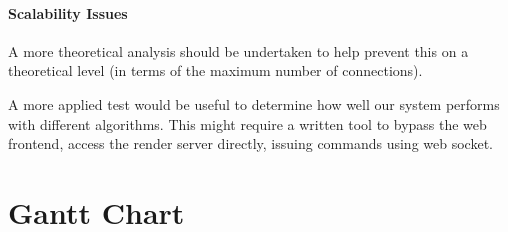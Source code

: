\documentclass[14pt]{article}
\begin{document}
\paragraph{Scalability Issues}
A more theoretical analysis should be undertaken to help prevent this on a theoretical level (in terms of the maximum number of connections).

A more applied test would be useful to determine how well our system performs with different algorithms. This might require a written tool to
bypass the web frontend, access the render server directly, issuing commands using web socket.
\section{Gantt Chart}
\end{document}
